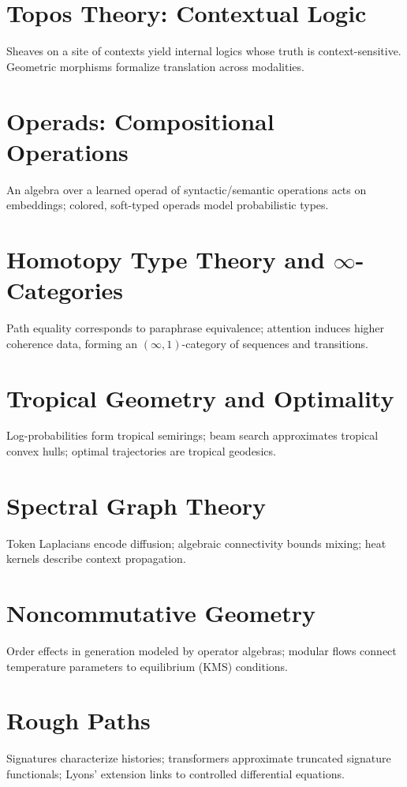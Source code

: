 \documentclass[12pt,a4paper]{article}
\theoremstyle{definition}
\begin{document}
\section{Topos Theory: Contextual Logic}
Sheaves on a site of contexts yield internal logics whose truth is context-sensitive. Geometric morphisms formalize translation across modalities.

\section{Operads: Compositional Operations}
An algebra over a learned operad of syntactic/semantic operations acts on embeddings; colored, soft-typed operads model probabilistic types.

\section{Homotopy Type Theory and $\infty$-Categories}
Path equality corresponds to paraphrase equivalence; attention induces higher coherence data, forming an $(\infty,1)$-category of sequences and transitions.

\section{Tropical Geometry and Optimality}
Log-probabilities form tropical semirings; beam search approximates tropical convex hulls; optimal trajectories are tropical geodesics.

\section{Spectral Graph Theory}
Token Laplacians encode diffusion; algebraic connectivity bounds mixing; heat kernels describe context propagation.

\section{Noncommutative Geometry}
Order effects in generation modeled by operator algebras; modular flows connect temperature parameters to equilibrium (KMS) conditions.

\section{Rough Paths}
Signatures characterize histories; transformers approximate truncated signature functionals; Lyons' extension links to controlled differential equations.
\end{document}
